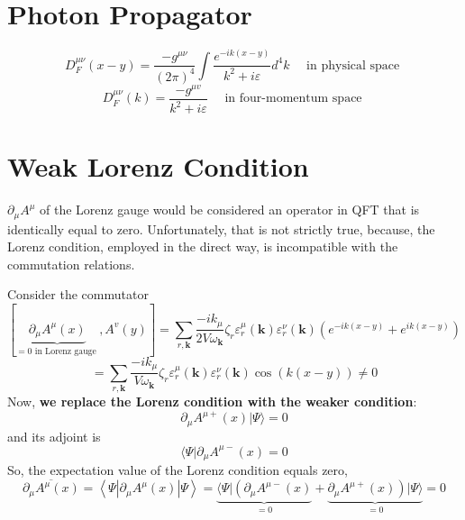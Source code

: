 \section{Photon Propagator}
\begin{equation}
D_{F}^{\mu \nu}(x-y)=\frac{-g^{\mu \nu}}{(2 \pi)^{4}} \int \frac{e^{-i k(x-y)}}{k^{2}+i \varepsilon} d^{4} k \quad \text { in physical space }
\end{equation}
\begin{equation}
D_{F}^{\mu \nu}(k)=\frac{-g^{\mu v}}{k^{2}+i \varepsilon} \quad \text { in four-momentum space }
\end{equation}
\section{Weak Lorenz Condition}
$\partial_{\mu} A^{\mu}$ of the Lorenz gauge would be considered an operator in QFT that is identically equal to zero. Unfortunately, that is not strictly true, because, the Lorenz condition, employed in the direct way, is incompatible with the commutation relations.

Consider the commutator
$$
[\underbrace{\partial_{\mu} A^{\mu}(x)}_{=0 \text { in Lorenz gauge }}, A^{v}(y)]=\sum_{r, \mathbf{k}} \frac{-i k_{\mu}}{2 V \omega_{\mathbf{k}}} \zeta_{r} \varepsilon_{r}^{\mu}(\mathbf{k}) \varepsilon_{r}^{\nu}(\mathbf{k})\left(e^{-i k(x-y)}+e^{i k(x-y)}\right)
$$
$$
=\sum_{r, \mathbf{k}} \frac{-i k_{\mu}}{V \omega_{\mathbf{k}}} \zeta_{r} \varepsilon_{r}^{\mu}(\mathbf{k}) \varepsilon_{r}^{\nu}(\mathbf{k}) \cos (k(x-y)) \neq 0
$$
Now, \textbf{we replace the Lorenz condition with the weaker condition}:
\begin{equation}
\partial_{\mu} A^{\mu+}(x)|\Psi\rangle= 0
\label{weak-lorenz-gauge}
\end{equation}
and its adjoint is
\begin{equation}
\langle\Psi| \partial_{\mu} A^{\mu-}(x)=0
\end{equation}
So, the expectation value of the Lorenz condition equals zero,
$$
\overline{\partial_{\mu} A^{\mu}(x)}=\left\langle\Psi\left|\partial_{\mu} A^{\mu}(x)\right| \Psi\right\rangle=\underbrace{\langle\Psi|\left(\partial_{\mu} A^{\mu-}(x)\right.}_{=0}+\underbrace{\left.\partial_{\mu} A^{\mu+}(x)\right)|\Psi\rangle}_{=0}=0
$$
